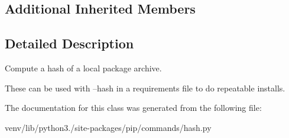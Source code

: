 \subsection*{Additional Inherited Members}


\subsection{Detailed Description}
\begin{DoxyVerb}Compute a hash of a local package archive.

These can be used with --hash in a requirements file to do repeatable
installs.\end{DoxyVerb}
 

The documentation for this class was generated from the following file\+:\begin{DoxyCompactItemize}
\item 
venv/lib/python3./site-\/packages/pip/commands/hash.\+py\end{DoxyCompactItemize}

